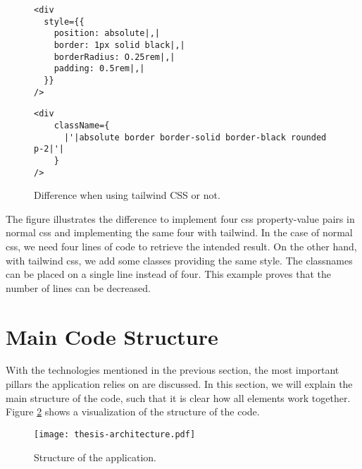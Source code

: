 \begin{figure}[H]
	\begin{minipage}[b]{0.5\textwidth}
 		\centering
  		\begin{verbatim}
<div
  style={{
    position: absolute|,|
    border: 1px solid black|,|
    borderRadius: O.25rem|,|
    padding: 0.5rem|,|
  }}
/>
		\end{verbatim}
		\label{lst:no-tailwind}
	\end{minipage}
 	\begin{minipage}[b]{0.5\textwidth}
  		\centering
		\begin{verbatim}
<div
    className={
      |'|absolute border border-solid border-black rounded p-2|'|
    }
/>
		\end{verbatim}
		\label{lst:tailwind}
 	\end{minipage}
	\caption{Difference when using tailwind CSS or not.}
	\label{fig:examplecode-tailwindcss}
\end{figure}

The figure illustrates the difference to implement four css property-value pairs in normal css and implementing the same four with tailwind. In the case of normal css, we need four lines of code to retrieve the intended result. On the other hand, with tailwind css, we add some classes providing the same style. The classnames can be placed on a single line instead of four. This example proves that the number of lines can be decreased.





\section{Main Code Structure}\label{sec:structure}
With the technologies mentioned in the previous section, the most important pillars the application relies on are discussed. In this section, we will explain the main structure of the code, such that it is clear how all elements work together. Figure \ref{fig:overall-structure} shows a visualization of the structure of the code.
\begin{figure}[H]
	\centering
	\texttt{[image: thesis-architecture.pdf]}
	\caption{Structure of the application.}
	\label{fig:overall-structure}
\end{figure}

